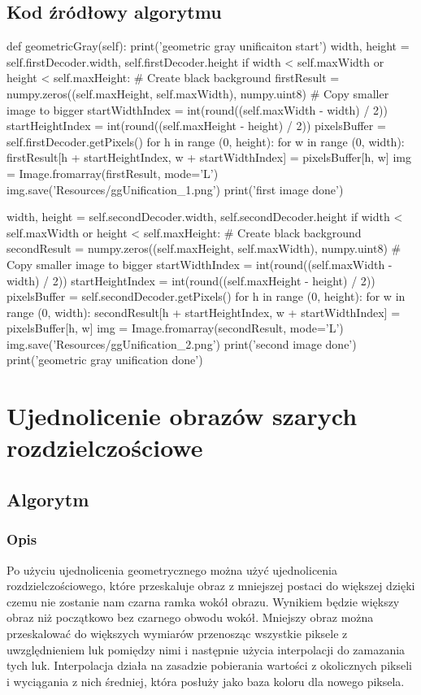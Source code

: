 \documentclass[a4paper,12pt]{book}
\begin{document}
\subsection*{Kod źródłowy algorytmu}
\begin{python}
def geometricGray(self):
	print('geometric gray unificaiton start')
	width, height = self.firstDecoder.width, self.firstDecoder.height
	if width < self.maxWidth or height < self.maxHeight:
		# Create black background
		firstResult = numpy.zeros((self.maxHeight, self.maxWidth), numpy.uint8)
		# Copy smaller image to bigger
		startWidthIndex = int(round((self.maxWidth - width) / 2))
		startHeightIndex = int(round((self.maxHeight - height) / 2))
		pixelsBuffer = self.firstDecoder.getPixels()
		for h in range (0, height):
		for w in range (0, width):
		firstResult[h + startHeightIndex, w + startWidthIndex] = pixelsBuffer[h, w]
		img = Image.fromarray(firstResult, mode='L')
		img.save('Resources/ggUnification_1.png')
		print('first image done')
	
	width, height = self.secondDecoder.width, self.secondDecoder.height
	if width < self.maxWidth or height < self.maxHeight:
		# Create black background
		secondResult = numpy.zeros((self.maxHeight, self.maxWidth), numpy.uint8)
		# Copy smaller image to bigger
		startWidthIndex = int(round((self.maxWidth - width) / 2))
		startHeightIndex = int(round((self.maxHeight - height) / 2))
		pixelsBuffer = self.secondDecoder.getPixels()
		for h in range (0, height):
		for w in range (0, width):
		secondResult[h + startHeightIndex, w + startWidthIndex] = pixelsBuffer[h, w]
		img = Image.fromarray(secondResult, mode='L')
		img.save('Resources/ggUnification_2.png')
		print('second image done')
	print('geometric gray unification done')
\end{python}
\section{Ujednolicenie obrazów szarych rozdzielczościowe}
\subsection*{Algorytm}
\subsubsection*{Opis}
Po użyciu ujednolicenia geometrycznego można użyć ujednolicenia rozdzielczościowego, które przeskaluje obraz z mniejszej postaci do większej dzięki czemu nie zostanie nam czarna ramka wokół obrazu. Wynikiem będzie większy obraz niż początkowo bez czarnego obwodu wokół. 
Mniejszy obraz można przeskalować do większych wymiarów przenosząc wszystkie piksele z uwzględnieniem luk pomiędzy nimi i następnie użycia interpolacji do zamazania tych luk. 
Interpolacja działa na zasadzie pobierania wartości z okolicznych pikseli i wyciągania z nich średniej, która posłuży jako baza koloru dla nowego piksela. 
\end{document}
